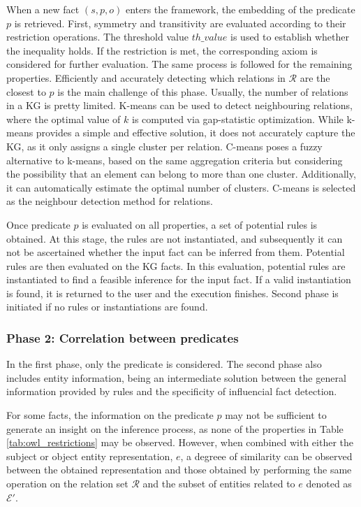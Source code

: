 When a new fact $(s,p,o)$ enters the framework, the embedding of the predicate $p$ is retrieved. First, symmetry and transitivity are evaluated according to their restriction operations. The threshold value $th\_value$ is used to establish whether the inequality holds. If the restriction is met, the corresponding axiom is considered for further evaluation. The same process is followed for the remaining properties. Efficiently and accurately detecting which relations in $\mathcal{R}$ are the closest to $p$ is the main challenge of this phase. Usually, the number of relations in a KG is pretty limited. K-means can be used to detect neighbouring relations, where the optimal value of $k$ is computed via gap-statistic optimization. While k-means provides a simple and effective solution, it does not accurately capture the KG, as it only assigns a single cluster per relation. C-means poses a fuzzy alternative to k-means, based on the same aggregation criteria but considering the possibility that an element can belong to more than one cluster. Additionally, it can automatically estimate the optimal number of clusters. C-means is selected as the neighbour detection method for relations.

Once predicate $p$ is evaluated on all properties, a set of potential rules is obtained. At this stage, the rules are not instantiated, and subsequently it can not be ascertained whether the input fact can be inferred from them. Potential rules are then evaluated on the KG facts. In this evaluation, potential rules are instantiated to find a feasible inference for the input fact. If a valid instantiation is found, it is returned to the user and the execution finishes. Second phase is initiated if no rules or instantiations are found.

\subsubsection*{Phase 2: Correlation between predicates}
In the first phase, only the predicate is considered. The second phase also includes entity information, being an intermediate solution between the general information provided by rules and the specificity of influencial fact detection. 

For some facts, the information on the predicate $p$ may not be sufficient to generate an insight on the inference process, as none of the properties in Table \ref{tab:owl_restrictions} may be observed. However, when combined with either the subject or object entity representation, $e$, a degreee of similarity can be observed between the obtained representation and those obtained by performing the same operation on the relation set $\mathcal{R}$ and the subset of entities related to $e$ denoted as $\mathcal{E}'$.

